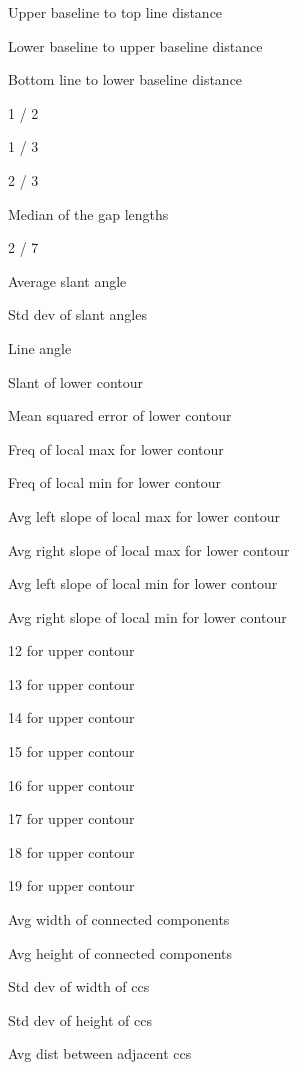 \documentclass[paper=a4, fontsize=11pt]{scrartcl} %
\numberwithin{equation}{section} %
\numberwithin{figure}{section} %
\numberwithin{table}{section} %
\begin{document}
\begin{figure}
  \begin{multicols}{3}
    \begin{enumerate*}
    \item Upper baseline to top line distance
    \item Lower baseline to upper baseline distance
    \item Bottom line to lower baseline distance
    \item 1 / 2
    \item 1 / 3
    \item 2 / 3
    \item Median of the gap lengths
    \item 2 / 7
    \item Average slant angle
    \item Std dev of slant angles
    \item Line angle
    \item Slant of lower contour
    \item Mean squared error of lower contour
    \item Freq of local max for lower contour
    \item Freq of local min for lower contour
    \item Avg left slope of local max for lower contour
    \item Avg right slope of local max for lower contour
    \item Avg left slope of local min for lower contour
    \item Avg right slope of local min for lower contour
    \item 12 for upper contour
    \item 13 for upper contour
    \item 14 for upper contour
    \item 15 for upper contour
    \item 16 for upper contour
    \item 17 for upper contour
    \item 18 for upper contour
    \item 19 for upper contour
    \item Avg width of connected components
    \item Avg height of connected components
    \item Std dev of width of ccs
    \item Std dev of height of ccs
    \item Avg dist between adjacent ccs

\end{enumerate*}
\end{multicols}
\end{figure}
\end{document}
